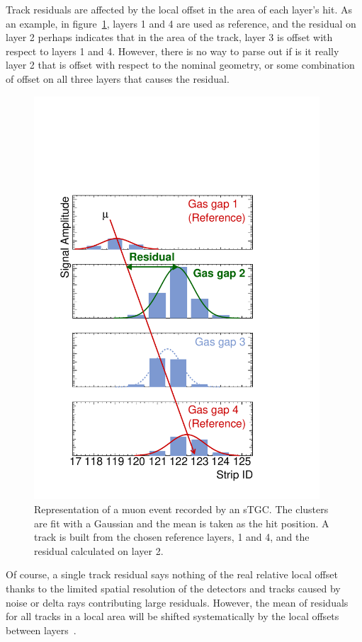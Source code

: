 Track residuals are affected by the local offset in the area of each layer's hit. As an example, in figure~\ref{fig:fake_event_display}, layers 1 and 4 are used as reference, and the residual on layer 2 perhaps indicates that in the area of the track, layer 3 is offset with respect to layers 1 and 4. However, there is no way to parse out if is it really layer 2 that is offset with respect to the nominal geometry, or some combination of offset on all three layers that causes the residual.

\begin{figure}
    \centering
    \includegraphics[width = 0.95\textwidth]{figures/figure_fake_event_display.pdf}
    \caption{Representation of a muon event recorded by an sTGC. The clusters are fit with a Gaussian and the mean is taken as the hit position. A track is built from the chosen reference layers, 1 and 4, and the residual calculated on layer 2.}
    \label{fig:fake_event_display}
\end{figure}

Of course, a single track residual says nothing of the real relative local offset thanks to the limited spatial resolution of the detectors and tracks caused by noise or delta rays contributing large residuals. However, the mean of residuals for all tracks in a local area will be shifted systematically by the local offsets between layers~\cite{lefebvre_thesis}. 


